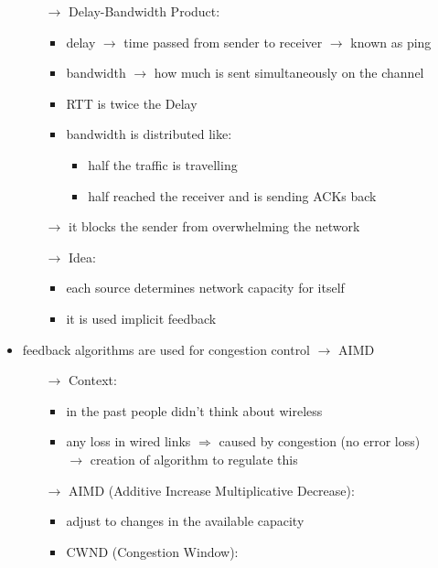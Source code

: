 \begin{itemize}
\begin{itemize}
        \item[$\rightarrow$] Delay-Bandwidth Product:
        \begin{itemize}
            \item delay $\rightarrow$ time passed from sender to receiver $\rightarrow$ known as ping
            \item bandwidth $\rightarrow$ how much is sent simultaneously on the channel
            \item RTT is twice the Delay
            \item bandwidth is distributed like:
            \begin{itemize}
                \item half the traffic is travelling
                \item half reached the receiver and is sending ACKs back
            \end{itemize}
        \end{itemize}
        \item[$\rightarrow$] it blocks the sender from overwhelming the network
        \item[$\rightarrow$] Idea:
        \begin{itemize}
            \item each source determines network capacity for itself
            \item it is used implicit feedback
        \end{itemize}
    \end{itemize}
    \item feedback algorithms are used for congestion control $\rightarrow$ AIMD
    \begin{itemize}
        \item[$\rightarrow$] Context:
        \begin{itemize}
            \item in the past people didn't think about wireless
            \item any loss in wired links $\Rightarrow$ caused by congestion (no error loss)\\
            $\rightarrow$ creation of algorithm to regulate this
        \end{itemize}
        \item[$\rightarrow$] AIMD (Additive Increase Multiplicative Decrease):
        \begin{itemize}
            \item adjust to changes in the available capacity
            \item CWND (Congestion Window):

\end{itemize}
\end{itemize}
\end{itemize}
